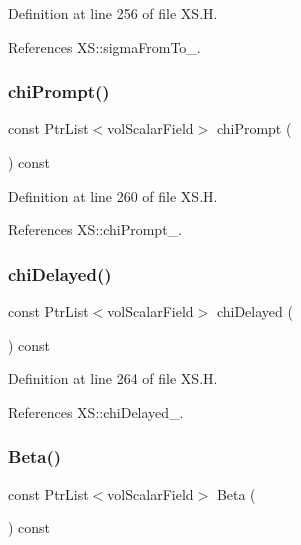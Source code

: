 Definition at line 256 of file X\+S.\+H.



References X\+S\+::sigma\+From\+To\+\_\+.

\mbox{\label{classFoam_1_1XS_a3a5e5dc25bec8fab86781d7eb546a92f}} 
\subsubsection{\texorpdfstring{chi\+Prompt()}{chiPrompt()}}
{\footnotesize\ttfamily const Ptr\+List$<$vol\+Scalar\+Field$>$ chi\+Prompt (\begin{DoxyParamCaption}{ }\end{DoxyParamCaption}) const\hspace{0.3cm}{\ttfamily [inline]}}



Definition at line 260 of file X\+S.\+H.



References X\+S\+::chi\+Prompt\+\_\+.

\mbox{\label{classFoam_1_1XS_a8453995c1f390f686ffb8d0f3fd639c6}} 
\subsubsection{\texorpdfstring{chi\+Delayed()}{chiDelayed()}}
{\footnotesize\ttfamily const Ptr\+List$<$vol\+Scalar\+Field$>$ chi\+Delayed (\begin{DoxyParamCaption}{ }\end{DoxyParamCaption}) const\hspace{0.3cm}{\ttfamily [inline]}}



Definition at line 264 of file X\+S.\+H.



References X\+S\+::chi\+Delayed\+\_\+.

\mbox{\label{classFoam_1_1XS_a18490f453da25d7d0de6e64d27566fe5}} 
\subsubsection{\texorpdfstring{Beta()}{Beta()}}
{\footnotesize\ttfamily const Ptr\+List$<$vol\+Scalar\+Field$>$ Beta (\begin{DoxyParamCaption}{ }\end{DoxyParamCaption}) const\hspace{0.3cm}{\ttfamily [inline]}}



